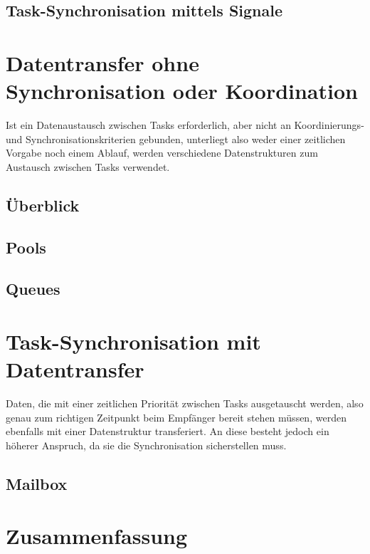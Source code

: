 \documentclass{llncs}
\begin{document}
\subsection{Task-Synchronisation mittels Signale}
\section{Datentransfer ohne Synchronisation oder Koordination}
Ist ein Datenaustausch zwischen Tasks erforderlich, aber nicht an Koordinierungs- und Synchronisationskriterien gebunden, unterliegt also weder einer zeitlichen Vorgabe noch einem Ablauf, werden verschiedene Datenstrukturen zum Austausch zwischen Tasks verwendet.  
\subsection{Überblick}
\subsection{Pools}
\subsection{Queues}
\section{Task-Synchronisation mit Datentransfer}
Daten, die mit einer zeitlichen Priorität zwischen Tasks ausgetauscht werden, also genau zum richtigen Zeitpunkt beim Empfänger bereit stehen müssen, werden ebenfalls mit einer Datenstruktur transferiert. An diese besteht jedoch ein höherer Anspruch, da sie die Synchronisation sicherstellen muss.
\subsection{Mailbox}
\section{Zusammenfassung}

\printbibliography
\end{document}
